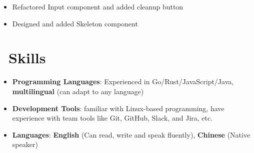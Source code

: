 \documentclass{resume}
\newcommand{\en}[1]{#1}
\newcommand{\zh}[1]{}
\begin{document}
\en{}
\zh{\role{前维护者}{\href{https://github.com/ant-design/ant-design/commits?author=hi-rustin}{24+ 个提交}}}
\begin{itemize}
      \item \en{Refactored Input component and added cleanup button}
            \zh{重构了 Input 组件，添加清理按钮}
      \item \en{Designed and added Skeleton component}
            \zh{设计并添加了 Skeleton 组件}
\end{itemize}

\section{\faCogs\ \en{Skills}\zh{技能}}
\begin{itemize}[parsep=0.25ex]
      \item \en{\textbf{Programming Languages}:
                  Experienced in Go/Rust/JavaScript/Java,
                  \textbf{multilingual} (can adapt to any language)}
            \zh{\textbf{编程语言}:
                  熟悉 Go/Rust/JavaScript/Java，
                  \textbf{泛语言}（编程不受特定语言限制）}

      \item \en{\textbf{Development Tools}:
                  familiar with Linux-based programming,
                  have experience with team tools like Git, GitHub, Slack, and Jira, etc.}
            \zh{\textbf{开发工具}:
                  熟悉 Linux，有 Git、GitHub、Slack 和 Jira 等团队协作工具的使用经验}

      \item \en{\textbf{Languages}:
                  \textbf{English} (Can read, write and speak fluently),
                  \textbf{Chinese} (Native speaker)}
            \zh{\textbf{语言}:
                  \textbf{英语} （可以流利的听说读写），
                  \textbf{中文} （母语）}
\end{itemize}
\end{document}
